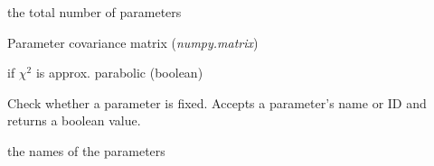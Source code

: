 \documentclass[a4paper,10pt,english]{sphinxmanual}
\begin{document}
\begin{fulllineitems}

\begin{fulllineitems}
\label{module_doc:kafe.fit.Fit.number_of_parameters}
the total number of parameters

\end{fulllineitems}


\begin{fulllineitems}
\label{module_doc:kafe.fit.Fit.par_cov_mat}
Parameter covariance matrix (\emph{numpy.matrix})

\end{fulllineitems}


\begin{fulllineitems}
\label{module_doc:kafe.fit.Fit.parabolic_errors}
 if \(\chi^2\) is approx. parabolic (boolean)

\end{fulllineitems}


\begin{fulllineitems}
\label{module_doc:kafe.fit.Fit.parameter_is_fixed}
Check whether a parameter is fixed. Accepts a parameter's name or ID
and returns a boolean value.

\end{fulllineitems}


\begin{fulllineitems}
\label{module_doc:kafe.fit.Fit.parameter_names}
the names of the parameters

\end{fulllineitems}



\end{fulllineitems}
\end{document}
